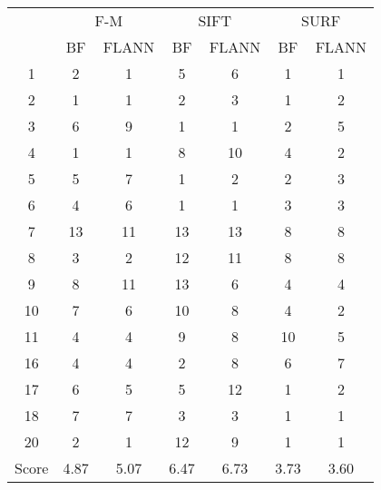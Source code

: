 \documentclass[draft,final]{vutinfth} %
\begin{document}
\begin{appendices}
\begin{minipage}{\linewidth}
\centering
\begin{tabular}{c|cc|cc|cc}
\multirow{2}{*}{ } & \multicolumn{2}{c}{ F-M } & \multicolumn{2}{c}{ SIFT } & \multicolumn{2}{c}{ SURF } \\
& BF & FLANN & BF & FLANN & BF & FLANN \\
\hline
1 & 2 & 1 & 5 & 6 & 1 & 1 \\
2 & 1 & 1 & 2 & 3 & 1 & 2 \\
3 & 6 & 9 & 1 & 1 & 2 & 5 \\
4 & 1 & 1 & 8 & 10 & 4 & 2 \\
5 & 5 & 7 & 1 & 2 & 2 & 3 \\
6 & 4 & 6 & 1 & 1 & 3 & 3 \\
7 & 13 & 11 & 13 & 13 & 8 & 8 \\
8 & 3 & 2 & 12 & 11 & 8 & 8 \\
9 & 8 & 11 & 13 & 6 & 4 & 4 \\
10 & 7 & 6 & 10 & 8 & 4 & 2 \\
11 & 4 & 4 & 9 & 8 & 10 & 5 \\
16 & 4 & 4 & 2 & 8 & 6 & 7 \\
17 & 6 & 5 & 5 & 12 & 1 & 2 \\
18 & 7 & 7 & 3 & 3 & 1 & 1 \\
20 & 2 & 1 & 12 & 9 & 1 & 1 \\
\hline
Score & 4.87 & 5.07 & 6.47 & 6.73 & 3.73 & 3.60 \\
\end{tabular}
 \label{tab:25Cent} 
\end{minipage}


\end{appendices}
\end{document}
